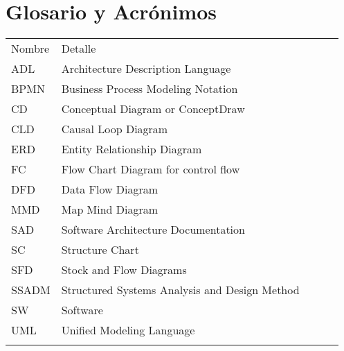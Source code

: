 \chapter{Glosario y Acrónimos}

\begin{table}[h]
\begin{tabular}{lllll}
\cline{1-2}
\multicolumn{1}{|l|}{Nombre} & \multicolumn{1}{l|}{Detalle}                              &  &  &  \\ \cline{1-2}
\multicolumn{1}{|l|}{ADL}   & \multicolumn{1}{l|}{Architecture Description Language}  &  &  &  \\ \cline{1-2}
\multicolumn{1}{|l|}{BPMN}   & \multicolumn{1}{l|}{Business Process Modeling Notation}  &  &  &  \\ \cline{1-2}
\multicolumn{1}{|l|}{CD}   & \multicolumn{1}{l|}{Conceptual Diagram or ConceptDraw}  &  &  &  \\ \cline{1-2}
\multicolumn{1}{|l|}{CLD}   & \multicolumn{1}{l|}{Causal Loop Diagram}  &  &  &  \\ \cline{1-2}
\multicolumn{1}{|l|}{ERD}   & \multicolumn{1}{l|}{Entity Relationship Diagram}  &  &  &  \\ \cline{1-2}
\multicolumn{1}{|l|}{FC}   & \multicolumn{1}{l|}{Flow Chart Diagram for control flow}  &  &  &  \\ \cline{1-2}
\multicolumn{1}{|l|}{DFD}   & \multicolumn{1}{l|}{Data Flow Diagram}  &  &  &  \\ \cline{1-2}
\multicolumn{1}{|l|}{MMD}   & \multicolumn{1}{l|}{Map Mind Diagram}  &  &  &  \\ \cline{1-2}
\multicolumn{1}{|l|}{SAD}  & \multicolumn{1}{l|}{Software Architecture Documentation} &  &  &  \\ \cline{1-2}
\multicolumn{1}{|l|}{SC}   & \multicolumn{1}{l|}{Structure Chart}  &  &  &  \\ \cline{1-2}
\multicolumn{1}{|l|}{SFD}   & \multicolumn{1}{l|}{Stock and Flow Diagrams}  &  &  &  \\ \cline{1-2}
\multicolumn{1}{|l|}{SSADM}   & \multicolumn{1}{l|}{Structured Systems Analysis and Design Method}  &  &  &  \\ \cline{1-2}
\multicolumn{1}{|l|}{SW}   & \multicolumn{1}{l|}{Software}                            &  &  &  \\ \cline{1-2}
\multicolumn{1}{|l|}{UML}   & \multicolumn{1}{l|}{Unified Modeling Language}  &  &  &  \\ \cline{1-2}


                           &                                                          &  &  & 
\end{tabular}
\end{table}


